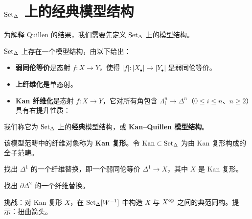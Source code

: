 \section{$\operatorname{Set}_{\Delta}$ 上的经典模型结构}

\nitem\label{L3-6.1}
为解释 Quillen 的结果，我们需要先定义 $\operatorname{Set}_{\Delta}$ 上的模型结构。

\begin{theoremdef}\label{L3-6.2}
$\operatorname{Set}_{\Delta}$ 上存在一个模型结构，由以下给出：
\begin{itemize}[leftmargin=3.4em,itemsep=0.15em]
\item [(W)] \textbf{弱同伦等价}是态射 $f\colon X\to Y$，使得
$|f|\colon|X_{\bullet}|\to|Y_{\bullet}|$ 是弱同伦等价。
\item [(C)] \textbf{上纤维化}是单态射。
\item [(F)] \textbf{Kan 纤维化}是态射 $f\colon X\to Y$，它对所有角包含 $\Lambda^{n}_{i}\to\Delta^{n}$（$0\le i\le n$、$n\ge 2$）具有右提升性质：
\begin{center}
\end{center}
\end{itemize}
我们称它为 $\operatorname{Set}_{\Delta}$ 上的\textbf{经典}模型结构，或 \textbf{Kan--Quillen 模型结构}。

该模型范畴中的纤维对象称为 \textbf{Kan 复形}。令 $\operatorname{Kan}\subset\operatorname{Set}_{\Delta}$ 为由 Kan 复形构成的全子范畴。
\end{theoremdef}

\begin{exercise}\label{L3-6.3}
找出 $\Delta^{1}$ 的一个纤维替换，即一个弱同伦等价 $\Delta^{1}\to X$，其中 $X$ 是 Kan 复形。
\end{exercise}

\begin{exercise}\label{L3-6.4}
找出 $\partial\Delta^{2}$ 的一个纤维替换。
\end{exercise}

\begin{exercise}\label{L3-6.5}
挑战：对 Kan 复形 $X$，在 $\operatorname{Set}_{\Delta}[W^{-1}]$ 中构造 $X$ 与 $X^{\mathrm{op}}$ 之间的典范同构。提示：扭曲箭头。
\end{exercise}

